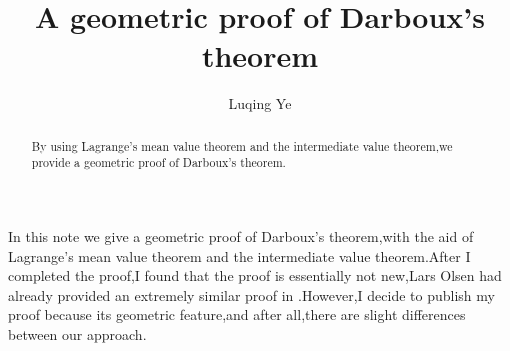 \documentclass{article} \usepackage{maa-monthly}
\theoremstyle{theorem} \newtheorem*{theorem}{Theorem}
\theoremstyle{definition} \newtheorem*{definition}{Definition}
\begin{document}
\title{A geometric proof of Darboux's theorem}

\author{Luqing Ye}

\maketitle

\begin{abstract}
By using Lagrange's mean value theorem and the intermediate value
theorem,we provide a geometric proof of Darboux's theorem.
\end{abstract}


\noindent
In this note we give a geometric proof of Darboux's theorem,with
the aid of Lagrange's mean value theorem and the intermediate value
theorem.After I completed the proof,I found that the proof is
essentially not new,Lars Olsen had already provided an extremely
similar proof in \cite{Lars}.However,I decide to publish my proof
because its geometric feature,and after all,there are slight
differences between our approach.
\end{document}

